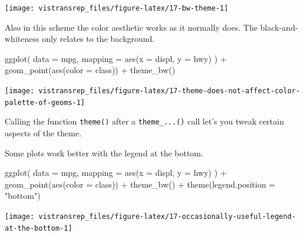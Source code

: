 \documentclass[]{book}
\newenvironment{Shaded}{}{}
\newcommand{\DataTypeTok}[1]{#1}
\newcommand{\KeywordTok}[1]{\textcolor[rgb]{0.00,0.00,1.00}{#1}}
\newcommand{\NormalTok}[1]{#1}
\newcommand{\OperatorTok}[1]{#1}
\newcommand{\StringTok}[1]{\textcolor[rgb]{0.00,0.50,0.50}{#1}}
\begin{document}
\begin{flushright}\texttt{[image: vistransrep\_files/figure-latex/17-bw-theme-1]} \end{flushright}

Also in this scheme the color aesthetic works as it normally does.
The black-and-whiteness only relates to the background.

\begin{Shaded}
\begin{Highlighting}[]
\KeywordTok{ggplot}\NormalTok{(}
  \DataTypeTok{data =}\NormalTok{ mpg,}
  \DataTypeTok{mapping =} \KeywordTok{aes}\NormalTok{(}\DataTypeTok{x =}\NormalTok{ displ, }\DataTypeTok{y =}\NormalTok{ hwy)}
\NormalTok{) }\OperatorTok{+}
\StringTok{  }\KeywordTok{geom_point}\NormalTok{(}\KeywordTok{aes}\NormalTok{(}\DataTypeTok{color =}\NormalTok{ class)) }\OperatorTok{+}
\StringTok{  }\KeywordTok{theme_bw}\NormalTok{()}
\end{Highlighting}
\end{Shaded}

\begin{flushright}\texttt{[image: vistransrep\_files/figure-latex/17-theme-does-not-affect-color-palette-of-geoms-1]} \end{flushright}

Calling the function \texttt{theme()} after a \texttt{theme\_...()} call let's you tweak certain aspects of the theme.

Some plots work better with the legend at the bottom.

\begin{Shaded}
\begin{Highlighting}[]
\KeywordTok{ggplot}\NormalTok{(}
  \DataTypeTok{data =}\NormalTok{ mpg,}
  \DataTypeTok{mapping =} \KeywordTok{aes}\NormalTok{(}\DataTypeTok{x =}\NormalTok{ displ, }\DataTypeTok{y =}\NormalTok{ hwy)}
\NormalTok{) }\OperatorTok{+}
\StringTok{  }\KeywordTok{geom_point}\NormalTok{(}\KeywordTok{aes}\NormalTok{(}\DataTypeTok{color =}\NormalTok{ class)) }\OperatorTok{+}
\StringTok{  }\KeywordTok{theme_bw}\NormalTok{() }\OperatorTok{+}
\StringTok{  }\KeywordTok{theme}\NormalTok{(}\DataTypeTok{legend.position =} \StringTok{"bottom"}\NormalTok{)}
\end{Highlighting}
\end{Shaded}

\begin{flushright}\texttt{[image: vistransrep\_files/figure-latex/17-occasionally-useful-legend-at-the-bottom-1]} \end{flushright}
\end{document}
